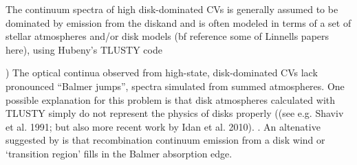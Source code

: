 \documentclass[preprint, a4paper, 11pt]{aastex}
\begin{document}
The continuum spectra of high disk-dominated CVs is generally assumed to be
dominated by emission from the diskand and is often modeled in terms of a set of stellar atmospheres
and/or disk models ({bf reference some of Linnells papers here}), using Hubeny's TLUSTY code {\cite{})
The optical continua observed from  high-state, disk-dominated CVs lack pronounced ``Balmer jumps'', 
spectra simulated from summed atmospheres.   One possible explanation for this problem is that disk atmospheres calculated
with TLUSTY simply do not represent the physics of disks properly ((see e.g. Shaviv et al. 1991; 
but also more recent work by Idan et al. 2010).
\nocite{idanshaviv2010} \nocite{shaviv1991}.   An altenative suggested by \cite{KLWB98} is that recombination continuum emission from a disk wind or `transition region'
fills  in the Balmer absorption edge. 

     






}
\end{document}
